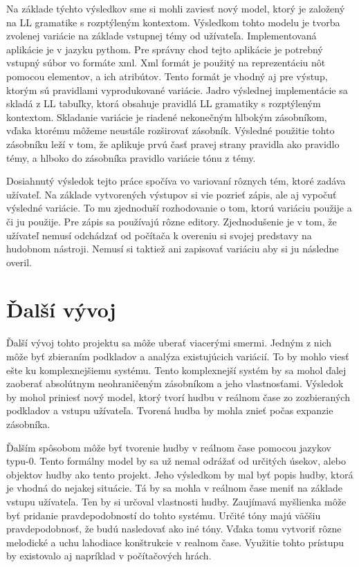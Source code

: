 Na základe týchto výsledkov sme si mohli zaviesť nový model, ktorý je založený na LL gramatike s rozptýleným kontextom. Výsledkom tohto modelu je tvorba zvolenej variácie na základe vstupnej témy od užívateľa. Implementovaná aplikácie je v jazyku pythom. Pre správny chod tejto aplikácie je potrebný vstupný súbor vo formáte xml. Xml formát je použitý na reprezentáciu nôt pomocou elementov, a ich atribútov. Tento formát je vhodný aj pre výstup, ktorým sú pravidlami vyprodukované variácie. Jadro výslednej implementácie sa skladá z LL tabuľky, ktorá obsahuje pravidlá LL gramatiky s rozptýleným kontextom. Skladanie variácie je riadené nekonečným hlbokým zásobníkom, vďaka ktorému môžeme neustále rozširovať zásobník. Výsledné použitie tohto zásobníku leží v tom, že aplikuje prvú časť pravej strany pravidla ako pravidlo témy, a hlboko do zásobníka pravidlo variácie tónu z témy.

Dosiahnutý výsledok tejto práce spočíva vo variovaní rôznych tém, ktoré zadáva užívateľ. Na základe vytvorených výstupov si vie pozrieť zápis, ale aj vypočuť výsledné variácie. To mu zjednoduší rozhodovanie o tom, ktorú variáciu použije a či ju použije. Pre zápis sa používajú rôzne editory. Zjednodušenie je v tom, že užívateľ nemusí odchádzať od počítača k overeniu si svojej predstavy na hudobnom nástroji. Nemusí si taktiež ani zapisovať variáciu aby si ju následne overil.

\section{Ďalší vývoj}
Ďalší vývoj tohto projektu sa môže uberať viacerými smermi. Jedným z nich môže byť zbieraním podkladov a analýza existujúcich variácií. To by mohlo viesť ešte ku komplexnejšiemu systému. Tento komplexnejší systém by sa mohol ďalej zaoberať absolútnym neohraničeným zásobníkom a jeho vlastnosťami. Výsledok by mohol priniesť nový model, ktorý tvorí hudbu v reálnom čase zo zozbieraných podkladov a vstupu užívateľa. Tvorená hudba by mohla znieť počas expanzie zásobníka.

Ďalším spôsobom môže byť tvorenie hudby v reálnom čase pomocou jazykov typu-0. Tento formálny model by sa už nemal odrážať od určitých úsekov, alebo objektov hudby ako tento projekt. Jeho výsledkom by mal byť popis hudby, ktorá je vhodná do nejakej situácie. Tá by sa mohla v reálnom čase meniť na základe vstupu užívateľa. Ten by si určoval vlastnosti hudby. Zaujímavá myšlienka môže byť pridanie pravdepodobností do tohto systému. Určité tóny majú väčšiu pravdepodobnosť, že budú nasledovať ako iné tóny. Vďaka tomu vytvoriť rôzne melodické a uchu lahodiace konštrukcie v realnom čase. Využitie tohto prístupu by existovalo aj napríklad v počítačových hrách. 

